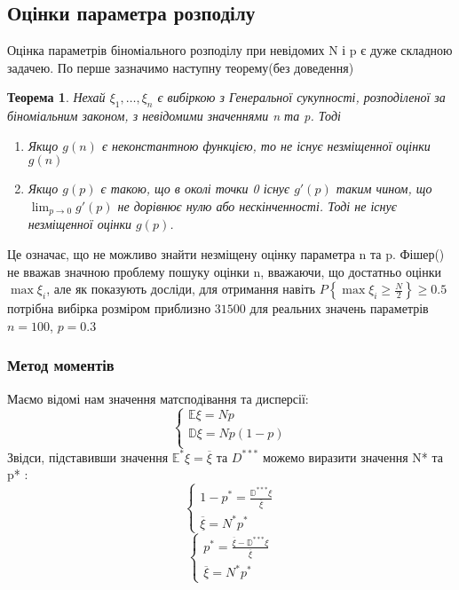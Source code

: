 \documentclass{article}
\newtheorem{theorem}{Теорема}
\begin{document}
\subsection{Оцінки параметра розподілу}
Оцінка параметрів біноміального розподілу при невідомих N і p є дуже складною задачею.
По перше зазначимо наступну теорему(без доведення)
\begin{theorem}
    Нехай $\xi_1, \dots, \xi_n$ є вибіркою з Генеральної сукупності, розподіленої за біноміальним
    законом, з невідомими значеннями n та p. Тоді
    \begin{enumerate}
        \item Якщо $g(n)$ є неконстантною функцією, то не існує незміщенної оцінки $g(n)$ 
        \item Якщо $g(p)$ є такою, що в околі точки 0 існує $g'(p)$ таким чином, що
            $\lim_{p\rightarrow 0} g'(p)$ не дорівнює нулю або нескінченності. Тоді не існує
            незміщенної оцінки $g(p)$.
    \end{enumerate}
\end{theorem}
Це означає, що не можливо знайти незміщену оцінку параметра n та p.
Фішер() не вважав значною проблему пошуку оцінки n, вважаючи, що достатньо оцінки $\max\xi_i$, але як показують досліди, для отримання навіть $P\left\{\max\xi_i \geq \frac{N}{2}\right\}\geq 0.5$
потрібна вибірка розміром приблизно $31 500$ для реальних значень параметрів $n=100$, $p=0.3$ 

\subsubsection{Метод моментів}
Маємо відомі нам значення матсподівання та дисперсії:
$$
\begin{cases}
    \mathbb{E}\xi=Np \\
    \mathbb{D}\xi=Np(1-p)\\
\end{cases}
$$
Звідси, підставивши значення $\mathbb{E}^*\xi = \overline{\xi}$ та $D^{***}$ можемо виразити
значення N* та p* :
$$
\begin{cases}
    1-p^* = \frac{\mathbb{D}^{***}\xi}{\overline{\xi}}\\
    \overline{\xi} = N^*p^*
\end{cases}
$$
$$
\begin{cases}
    p^* = \frac{\overline{\xi} - \mathbb{D}^{***}\xi}{\overline{\xi}}\\
    \overline{\xi} = N^*p^*
\end{cases}
$$
\end{document}
